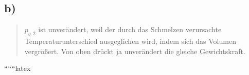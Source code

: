 

\subsection*{b)}

\begin{quote}
$p_{g,2}$ ist unverändert, weil der durch das Schmelzen verursachte Temperaturunterschied ausgeglichen wird, indem sich das Volumen vergrößert. Von oben drückt ja unverändert die gleiche Gewichtskraft.
\end{quote}

``````latex